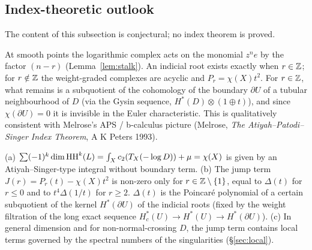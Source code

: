 \subsection{Index-theoretic outlook}\label{sec:index}
The content of this subsection is conjectural; no index theorem is proved.
\begin{obs}
At smooth points the logarithmic complex acts on the monomial $z^ne$ by the factor $(n-r)$ (Lemma~\ref{lem:stalk}). An indicial root exists exactly when $r\in\mathbb Z$; for $r\notin\mathbb Z$ the weight-graded complexes are acyclic and $P_r=\chi(X)t^2$. For $r\in\mathbb Z$, what remains is a subquotient of the cohomology of the boundary $\partial U$ of a tubular neighbourhood of $D$ (via the Gysin sequence, $H^*(D)\otimes(1\oplus t)$), and since $\chi(\partial U)=0$ it is invisible in the Euler characteristic. This is qualitatively consistent with Melrose's APS / b-calculus picture (Melrose, \emph{The Atiyah--Patodi--Singer Index Theorem}, A K Peters 1993).
\end{obs}
\begin{conj}\tK\label{conj:I3}
(a) $\sum(-1)^k\dim\mathrm{HH}^k(L)=\int_Xc_2(T_X(-\log D))+\mu=\chi(X)$ is given by an Atiyah--Singer-type integral without boundary term. (b) The jump term $J(r)=P_r(t)-\chi(X)t^2$ is non-zero only for $r\in\mathbb Z\setminus\{1\}$, equal to $\Delta(t)$ for $r\le0$ and to $t^4\Delta(1/t)$ for $r\ge2$. $\Delta(t)$ is the Poincar\'e polynomial of a certain subquotient of the kernel $H^*(\partial U)$ of the indicial roots (fixed by the weight filtration of the long exact sequence $H_c^*(U)\to H^*(U)\to H^*(\partial U)$). (c) In general dimension and for non-normal-crossing $D$, the jump term contains local terms governed by the spectral numbers of the singularities (\S\ref{sec:local}).
\end{conj}
